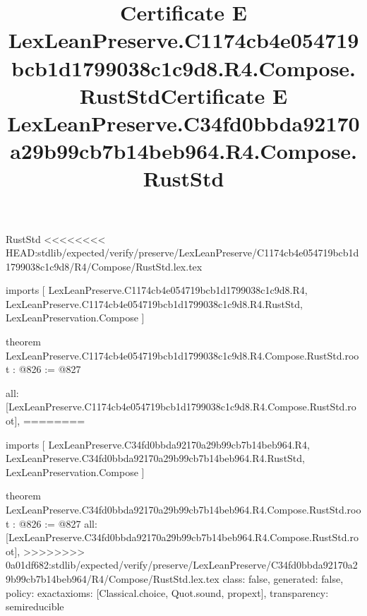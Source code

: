\begin{lexlean}{RustStd}
<<<<<<<< HEAD:stdlib/expected/verify/preserve/LexLeanPreserve/C1174cb4e054719bcb1d1799038c1c9d8/R4/Compose/RustStd.lex.tex
\title{Certificate E LexLeanPreserve.C1174cb4e054719bcb1d1799038c1c9d8.R4.Compose.RustStd}
\begin{coremodule}
imports [
  LexLeanPreserve.C1174cb4e054719bcb1d1799038c1c9d8.R4,
  LexLeanPreserve.C1174cb4e054719bcb1d1799038c1c9d8.R4.RustStd,
  LexLeanPreservation.Compose
]

theorem LexLeanPreserve.C1174cb4e054719bcb1d1799038c1c9d8.R4.Compose.RustStd.root : @826 := @827 {
  all: [LexLeanPreserve.C1174cb4e054719bcb1d1799038c1c9d8.R4.Compose.RustStd.root],
========
\title{Certificate E LexLeanPreserve.C34fd0bbda92170a29b99cb7b14beb964.R4.Compose.RustStd}
\begin{coremodule}
imports [
  LexLeanPreserve.C34fd0bbda92170a29b99cb7b14beb964.R4,
  LexLeanPreserve.C34fd0bbda92170a29b99cb7b14beb964.R4.RustStd,
  LexLeanPreservation.Compose
]

theorem LexLeanPreserve.C34fd0bbda92170a29b99cb7b14beb964.R4.Compose.RustStd.root : @826 := @827 {
  all: [LexLeanPreserve.C34fd0bbda92170a29b99cb7b14beb964.R4.Compose.RustStd.root],
>>>>>>>> 0a01df682:stdlib/expected/verify/preserve/LexLeanPreserve/C34fd0bbda92170a29b99cb7b14beb964/R4/Compose/RustStd.lex.tex
  class: false,
  generated: false,
  policy: exact{axioms: [Classical.choice, Quot.sound, propext]},
  transparency: semireducible
}


\end{coremodule}}
\end{coremodule}
\end{lexlean}
